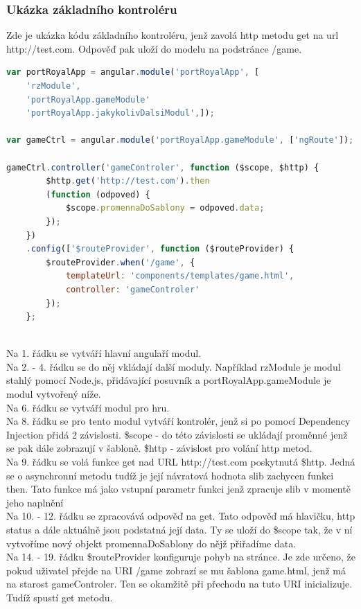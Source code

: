 \documentclass[czech,master,public,dept460,male,cpdeclaration,twoside]{diploma}
\begin{document}
\subsubsection{Ukázka základního kontroléru}
Zde je ukázka kódu základního kontroléru, jenž zavolá http metodu get na url http://test.com. Odpověď pak uloží do modelu na podstránce /game.
\begin{lstlisting}[language=JavaScript,label=src:JavaScript, caption=Ukázka kontroléru v AngularJS]
var portRoyalApp = angular.module('portRoyalApp', [
    'rzModule',
    'portRoyalApp.gameModule'
    'portRoyalApp.jakykolivDalsiModul',]);

var gameCtrl = angular.module('portRoyalApp.gameModule', ['ngRoute']);

gameCtrl.controller('gameControler', function ($scope, $http) {
        $http.get('http://test.com').then
        (function (odpoved) {
            $scope.promennaDoSablony = odpoved.data;
        });
    })
    .config(['$routeProvider', function ($routeProvider) {
        $routeProvider.when('/game', {
            templateUrl: 'components/templates/game.html',
            controller: 'gameControler'
        });
    };
\end{lstlisting}
~\\
Na 1. řádku se vytváří hlavní angulaří modul.\\
Na 2. - 4. řádku  se do něj vkládají další moduly. Například rzModule je modul stahlý pomocí Node.js, přidávající posuvník a portRoyalApp.gameModule je modul vytvořený níže.\\
Na 6. řádku se vytváří modul pro hru.\\
Na 8. řádku se pro tento modul vytváří kontrolér, jenž si po pomocí Dependency Injection přidá 2 závislosti. \$scope - do této závislosti se ukládají proměnné jenž se pak dále zobrazují v šabloně. \$http - závislost pro volání http metod.\\
Na 9. řádku se volá funkce get nad URL http://test.com poskytnutá \$http. Jedná se o asynchronní metodu tudíž je její návratová hodnota slib zachycen funkci then. Tato funkce má jako vstupní parametr funkci jenž zpracuje slib v momentě jeho naplnění\\
Na 10. - 12. řádku se zpracovává odpověď na get. Tato odpověď má hlavičku, http status a dále aktuálně jsou podstatná její data. Ty se uloží do \$scope tak, že v ní vytvoříme nový objekt promennaDoSablony do nějž přiřadíme data.\\
Na 14. - 19.  řádku \$routeProvider konfiguruje pohyb na stránce. Je zde určeno, že pokud uživatel přejde na URI /game zobrazí se mu šablona game.html, jenž má na starost gameControler. Ten se okamžitě při přechodu na tuto URI inicializuje. Tudíž spustí get metodu.
\end{document}

